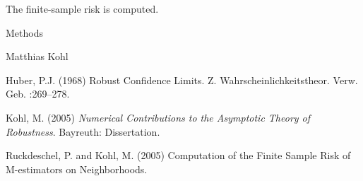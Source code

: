 \begin{Value}
The finite-sample risk is computed.
\end{Value}
\begin{Section}{Methods}
\end{Section}
\begin{Author}\relax
Matthias Kohl 
\end{Author}
\begin{References}\relax
Huber, P.J. (1968) Robust Confidence Limits. Z. Wahrscheinlichkeitstheor.
Verw. Geb. :269--278.

Kohl, M. (2005) \emph{Numerical Contributions to the Asymptotic Theory of Robustness}. 
Bayreuth: Dissertation.

Ruckdeschel, P. and Kohl, M. (2005) Computation of the Finite Sample Risk 
of M-estimators on Neighborhoods.
\end{References}
\begin{SeeAlso}\relax
{}
\end{SeeAlso}

